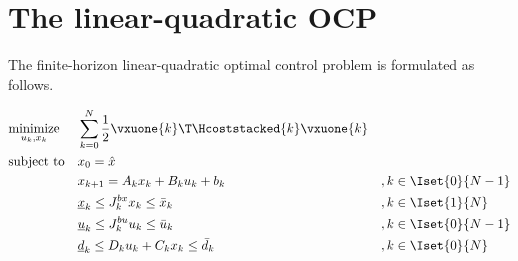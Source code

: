 
\section{The linear-quadratic OCP}
\label{sec:lq_ocp}
The finite-horizon linear-quadratic optimal control problem is formulated as follows.

\[
\begin{aligned}
& \underset{u_k, x_k}{\text{minimize}} & & \sum_{k=0}^{N} \frac{1}{2} \vxuone{k}\T \Hcoststacked{k} \vxuone{k} & &                      \\
& \text{subject to}                    & & x_0 = \hat{x}                                                       & &                      \\
&                                      & & x_{k+1} = A_k x_k + B_k u_k + b_k                                   & & ,k\in\Iset{0}{N-1}   \\
&                                      & & \underline{x}_k \leq J_k^{bx} x_k \leq \bar{x}_k                    & & ,k\in\Iset{1}{N}     \\
&                                      & & \underline{u}_k \leq J_k^{bu} u_k \leq \bar{u}_k                    & & ,k\in\Iset{0}{N-1}   \\
&                                      & & \underline{d}_k \leq D_k u_k + C_k x_k \leq \bar{d}_k               & & ,k\in\Iset{0}{N}
\end{aligned}
\]

